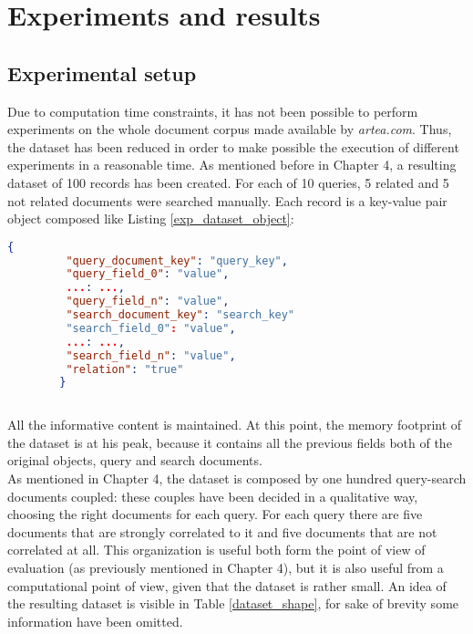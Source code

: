 \documentclass[\main/main.tex]{subfiles}
\begin{document}
\chapter{Experiments and results}
\section{Experimental setup}
Due to computation time constraints, it has not been possible to perform experiments on the whole document corpus made available by \emph{artea.com}. Thus, the dataset has been reduced in order to make possible the execution of different experiments in a reasonable time. As mentioned before in Chapter 4, a resulting dataset of 100 records has been created. For each of 10 queries, 5 related and 5 not related documents were searched manually. Each record is a key-value pair object composed like Listing \ref{exp_dataset_object}:
\begin{center}
    \begin{lstlisting}[language=json, caption="Experimental dataset object", captionpos=b, label={exp_dataset_object}]
        {
         "query_document_key": "query_key",
         "query_field_0": "value",
         ...: ...,
         "query_field_n": "value",
         "search_document_key": "search_key"
         "search_field_0": "value",
         ...: ...,
         "search_field_n": "value",
         "relation": "true"
        }
    
    \end{lstlisting}
\end{center}
All the informative content is maintained. At this point, the memory footprint of the dataset is at his peak, because it contains all the previous fields both of the original objects, query and search documents.\\
As mentioned in Chapter 4, the dataset is composed by one hundred query-search documents coupled: these couples have been decided in a qualitative way, choosing the right documents for each query. For each query there are five documents that are strongly correlated to it and five documents that are not correlated at all. This organization is useful both form the point of view of evaluation (as previously mentioned in Chapter 4), but it is also useful from a computational point of view, given that the dataset is rather small.
An idea of the resulting dataset is visible in Table \ref{dataset_shape}, for sake of brevity some information have been omitted.
\end{document}
